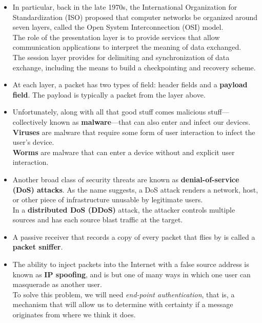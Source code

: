 \begin{itemize}
\item In particular, back in the late 1970s, the International Organization for Standardization (ISO) proposed that computer networks be organized around seven layers, called the Open System Interconnection (OSI) model.\\The role of the presentation layer is to provide services that allow communication applications to interpret the meaning of data exchanged.\\The session layer provides for delimiting and synchronization of data exchange, including the means to build a checkpointing and recovery scheme.

\item At each layer, a packet has two types of field: header fields and a \textbf{payload field}. The payload is typically a packet from the layer above.

\item Unfortunately, along with all that good stuff comes malicious stuff---collectively known as \textbf{malware}---that can also enter and infect our devices.\\\textbf{Viruses} are malware that require some form of user interaction to infect the user's device.\\\textbf{Worms} are malware that can enter a device without and explicit user interaction.

\item Another broad class of security threats are known as \textbf{denial-of-service (DoS) attacks}. As the name suggests, a DoS attack renders a network, host, or other piece of infrastructure unusable by legitimate users.\\In a \textbf{distributed DoS (DDoS)} attack, the attacker controls multiple sources and has each source blast traffic at the target.

\item A passive receiver that records a copy of every packet that flies by is called a \textbf{packet sniffer}.

\item The ability to inject packets into the Internet with a false source address is known as \textbf{IP spoofing}, and is but one of many ways in which one user can masquerade as another user.\\To solve this problem, we will need \textit{end-point authentication}, that is, a mechanism that will allow us to determine with certainty if a message originates from where we think it does.






















\end{itemize}